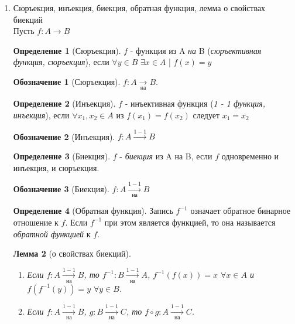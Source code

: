 \documentclass[a4paper]{article}
\newtheorem*{lemma*}{Лемма}
\theoremstyle{definition}
\newtheorem*{definition*}{Определение}
\newtheorem*{name}{Обозначение}
\begin{document}
\begin{enumerate}
\begin{lemma*}[о композиции функций]
        Если $f: A \rightarrow B, g:B\rightarrow C$, то их композицией $g\circ{f} : A\rightarrow C$
        и $[g\circ{f}](x)=g(f(x))$ при $x\in{A}$
       \end{lemma*}
 \item Сюръекция, инъекция, биекция, обратная функция, лемма о свойствах биекций
       \\ Пусть $ f: A \rightarrow B$
       \begin{definition*}[Сюръекция]
        $f$ - функция из A \textit{на} B (\textit{сюръективная функция, сюръекция}), если $\forall y \in B$ $\exists x \in A$ | $f(x) = y$
       \end{definition*}
       \begin{name}[Сюръекция]
        $f: A\xrightarrow[\textit{на}]{}B$.
       \end{name}
       \begin{definition*}[Инъекция]
        $f$ - инъективная функция (\textit{1 - 1 функция, инъекция}), если $\forall x_{1}, x_{2}\in A $ из $f(x_{1}) = f(x_{2})$ следует $x_{1} = x_{2}$
       \end{definition*}
       \begin{name}[Инъекция]
        $f: A \xrightarrow{1-1} B$
       \end{name}
       \begin{definition*}[Биекция]
        $f$ - \textit{биекция} из A на B, если $f$ одновременно и инъекция, и сюръекция.
       \end{definition*}
       \begin{name}[Биекция]
        $f: A \xrightarrow[\textit{на}]{1-1} B$
       \end{name}
       \begin{definition*}[Обратная функция]
        Запись $f^{-1}$ означает обратное бинарное отношение к $f$. Если $f^{-1}$ при этом является функцией, то она называется \textit{обратной функцией} к $f$.
       \end{definition*}

       \begin{lemma*}[о свойствах биекций]\mbox{}\\
        \begin{enumerate}
         \item Если $f: A \xrightarrow[\textit{на}]{1-1} B$, то $f^{-1}: B \xrightarrow[\textit{на}]{1-1} A$, $f^{-1}(f(x)) = x$ $\forall x \in A$ и $f(f^{-1}(y)) = y$ $\forall y \in B$.
         \item Если $f: A \xrightarrow[\textit{на}]{1-1} B$, $g: B \xrightarrow[\textit{на}]{1-1} C$, то $f \circ g:  A \xrightarrow[\textit{на}]{1-1} C$.
        \end{enumerate}
       \end{lemma*}



\end{enumerate}
\end{document}
